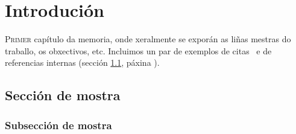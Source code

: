 \chapter{Introdución}
\label{chap:introducion}

\lettrine{P}{rimer} capítulo da memoria, onde xeralmente se exporán as
liñas mestras do traballo, os obxectivos, etc. Incluimos un par de
exemplos de citas~\cite{ErlangBook,ErlangWebBook} e de referencias
internas (sección \ref{sec:mostra}, páxina \pageref{sec:mostra}).

\Blindtext

\section{Sección de mostra}
\label{sec:mostra}

\Blindtext

\subsection{Subsección de mostra}

\Blindtext
